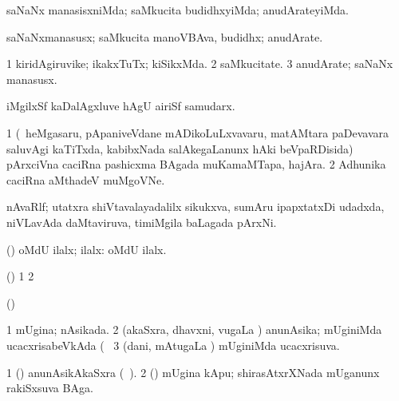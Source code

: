 \bentry
{}
\gl{\kirxvi}
\bmng
saNaNx manasisxniMda; saMkucita budidhxyiMda; anudArateyiMda. 
\emng
\eentry

\bentry
{}
\gl{\nA}
\bmng
saNaNxmanasusx; saMkucita manoVBAva, budidhx; anudArate. 
\emng
\eentry

\bentry
{}
\gl{\nA}
\bmng
\bnum
\num{1} kiridAgiruvike; ikakxTuTx; kiSikxMda. 
\num{2} saMkucitate. 
\num{3} anudArate; saNaNx manasusx. 
\enum
\emng
\eentry

\bentry
{}
\gl{\nA}
\bmng
iMgilxSf kaDalAgxluve hAgU airiSf samudarx. 
\emng
\eentry

\bentry
{}
\gl{\nA}
\bmng
\bnum
\num{1} (\sA\ heMgasaru, pApaniveVdane mADikoLuLxvavaru, matAMtara paDevavara saluvAgi kaTiTxda, kabibxNada salAkegaLanunx hAki beVpaRDisida) pArxciVna caciRna pashicxma BAgada muKamaMTapa, hajAra. 
\num{2} Adhunika caciRna aMthadeV muMgoVNe. 
\enum
\emng
\eentry

\bentry
{}
\gl{\nA}
\bmng
nAvaRlf; utatxra shiVtavalayadalilx sikukxva, sumAru ipapxtatxDi udadxda, niVLavAda daMtaviruva, timiMgila baLagada pArxNi.  
\emng
\eentry

\bentry
{}
\gl{\gu}
\bmng
(\AmA) oMdU ilalx; ilalx:  oMdU ilalx. 
\emng
\eentry

\bentry
{}
\gl{\saMkiSx}
\bmng
(\birx) 
\bnum
\num{1}  
\num{2}  
\enum
\emng
\eentry

\bentry
{}
\gl{\saMkiSx}
\bmng
(\ame)  
\emng
\eentry

\bentry
{}
\gl{\gu}
\bmng
\bnum
\num{1} mUgina; nAsikada. 
\num{2} (akaSxra, dhavxni, \mo vugaLa \vi) anunAsika; mUginiMda ucacxrisabeVkAda (\udA\  
\num{3} (dani, mAtugaLa \vi) mUginiMda ucacxrisuva. 
\enum
\emng
\eentry

\bentry
{}
\gl{\nA}
\bmng
\bnum
\num{1} (\dhavxni) anunAsikAkaSxra (\udA\ ). 
\num{2} (\ca) mUgina kApu; shirasAtxrXNada mUganunx rakiSxsuva BAga. 
\enum
\emng
\eentry

